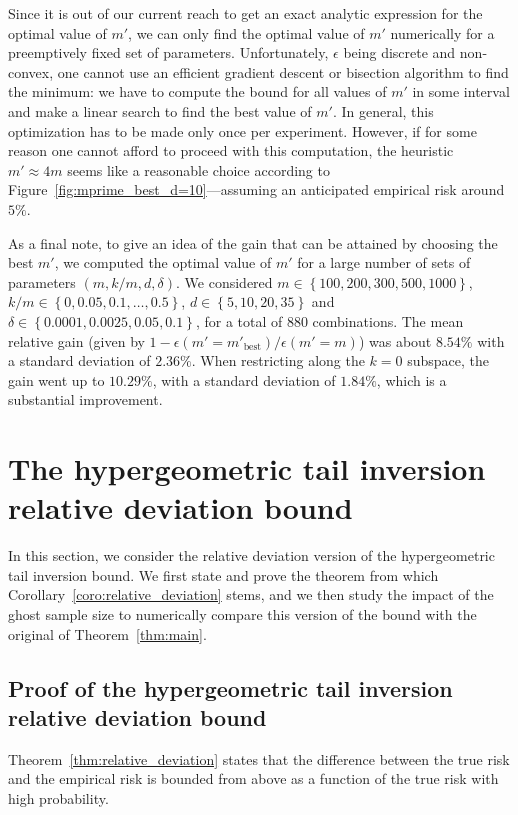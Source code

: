 \documentclass[twoside,11pt]{article}
\newcommand{\cb}[1]{\left\{#1\right\}}
\begin{document}
Since it is out of our current reach to get an exact analytic expression for the optimal value of $m'$, we can only find the optimal value of $m'$ numerically for a preemptively fixed set of parameters.
Unfortunately, $\epsilon$ being discrete and non-convex, one cannot use an efficient gradient descent or bisection algorithm to find the minimum: we have to compute the bound for all values of $m'$ in some interval and make a linear search to find the best value of $m'$.
In general, this optimization has to be made only once per experiment.
However, if for some reason one cannot afford to proceed with this computation, the heuristic $m'\approx 4m$ seems like a reasonable choice according to Figure~\ref{fig:mprime_best_d=10}---assuming an anticipated empirical risk around $5\%$.

As a final note, to give an idea of the gain that can be attained by choosing the best $m'$, we computed the optimal value of $m'$ for a large number of sets of parameters $(m, k/m, d, \delta)$.
We considered $m \in \cb{100, 200, 300, 500, 1000}$, $k/m \in \cb{0, 0.05, 0.1, \dots, 0.5}$, $d \in \cb{5, 10, 20, 35}$ and $\delta \in \cb{0.0001, 0.0025, 0.05, 0.1}$, for a total of 880 combinations. 
The mean relative gain (given by $1 - \epsilon(m'=m'_\text{best})/\epsilon(m'=m)$) was about $8.54\%$ with a standard deviation of $2.36\%$.
When restricting along the $k=0$ subspace, the gain went up to $10.29\%$, with a standard deviation of $1.84\%$,
which is a substantial improvement.






\clearpage



\section{The hypergeometric tail inversion relative deviation bound}
\label{app:hyptailinv_reldev}


In this section, we consider the relative deviation version of the hypergeometric tail inversion bound.
We first state and prove the theorem from which Corollary~\ref{coro:relative_deviation} stems, and we then study the impact of the ghost sample size to numerically compare this version of the bound with the original of Theorem~\ref{thm:main}.

\subsection{Proof of the hypergeometric tail inversion relative deviation bound}
\label{app:proof_reldev}
Theorem~\ref{thm:relative_deviation} states that the difference between the true risk and the empirical risk is bounded from above as a function of the true risk with high probability.
\end{document}
